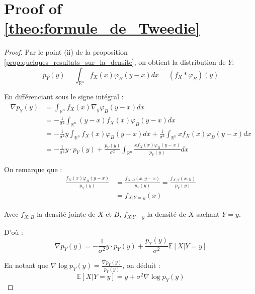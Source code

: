 \documentclass[a4paper,10pt]{article}
\theoremstyle{definition} %
\theoremstyle{definition} %
\theoremstyle{definition} %
\theoremstyle{definition} %
\begin{document}



\section{Proof of \cref{theo:formule_de_Tweedie}}\label{sec:proof_formule_de_Tweedie}
\begin{proof}
Par le point (ii) de la proposition \cref{prop:quelques_resultats_sur_la_densite}, on obtient la distribution de $Y$:
\[ p_Y(y) = \int_{\mathbb{R}^n} f_X(x) \varphi_B(y - x) dx = (f_X * \varphi_B)(y) \]

En différenciant sous le signe intégral :
\begin{align*}
\nabla p_Y(y) &= \int_{\mathbb{R}^n} f_X(x) \nabla_y \varphi_B(y - x) dx \\
&= -\frac{1}{\sigma^2} \int_{\mathbb{R}^n} (y - x) f_X(x) \varphi_B(y - x) dx \\
&= -\frac{1}{\sigma^2} y \int_{\mathbb{R}^n} f_X(x) \varphi_B(y - x) dx + \frac{1}{\sigma^2} \int_{\mathbb{R}^n} x f_X(x) \varphi_B(y - x) dx \\
&= -\frac{1}{\sigma^2} y \cdot p_Y(y) + \frac{p_Y(y)}{\sigma^2} \int_{\mathbb{R}^n} \frac{x f_X(x) \varphi_B(y - x)}{p_Y(y)} dx
\end{align*}

On remarque que :
\begin{align*}
\frac{f_X(x) \varphi_B(y - x)}{p_Y(y)} &= \frac{f_{X,B}(x, y - x)}{p_Y(y)} = \frac{f_{X,Y}(x, y)}{p_Y(y)} \\
&= f_{X|Y=y}(x)
\end{align*}

Avec $f_{X,B}$ la densité jointe de $X$ et $B$, $f_{X|Y=y}$ la densité de $X$ sachant $Y = y$.

D'où :
\[ \nabla p_Y(y) = -\frac{1}{\sigma^2} y \cdot p_Y(y) + \frac{p_Y(y)}{\sigma^2} \mathbb{E}[X | Y = y] \]

En notant que $\nabla \log p_Y(y) = \frac{\nabla p_Y(y)}{p_Y(y)}$, on déduit :
\[ \mathbb{E}[X | Y = y] = y + \sigma^2 \nabla \log p_Y(y) \]
\end{proof}
\end{document}
